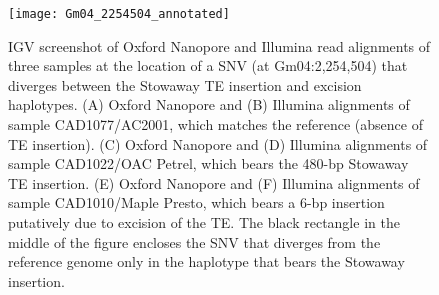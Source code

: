 \documentclass[12pt]{article}
\newenvironment{lsfigure}
	{\begin{landscape} \begin{figure} \centering}
	{\end{figure} \end{landscape}}
\begin{document}
\begin{lsfigure}
	\texttt{[image: Gm04\_2254504\_annotated]}

	\caption[IGV screenshot of Oxford Nanopore and Illumina read alignments of three samples at the location of a SNV that diverges between the Stowaway TE insertion and excision haplotypes]{
		IGV screenshot of Oxford Nanopore and Illumina read alignments of three samples at the location of a SNV (at Gm04:2,254,504) that diverges between the Stowaway TE insertion and excision haplotypes.
		(A) Oxford Nanopore and (B) Illumina alignments of sample CAD1077/AC2001, which matches the reference (absence of TE insertion).
		(C) Oxford Nanopore and (D) Illumina alignments of sample CAD1022/OAC Petrel, which bears the 480-bp Stowaway TE insertion.
		(E) Oxford Nanopore and (F) Illumina alignments of sample CAD1010/Maple Presto, which bears a 6-bp insertion putatively due to excision of the TE.
		The black rectangle in the middle of the figure encloses the SNV that diverges from the reference genome only in the haplotype that bears the Stowaway insertion.
	}

	\label{fig_s21}

\end{lsfigure}

\clearpage%



\end{document}
